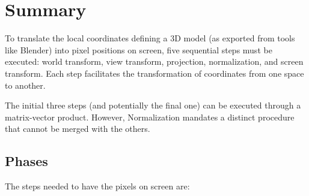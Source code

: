\section{Summary}

To translate the local coordinates defining a 3D model (as exported from tools like Blender) into pixel positions on screen, five sequential steps must be executed: world transform, view transform, projection, normalization, and screen transform. 
Each step facilitates the transformation of coordinates from one space to another.

The initial three steps (and potentially the final one) can be executed through a matrix-vector product. 
However, Normalization mandates a distinct procedure that cannot be merged with the others.

\subsection{Phases}
The steps needed to have the pixels on screen are: 
